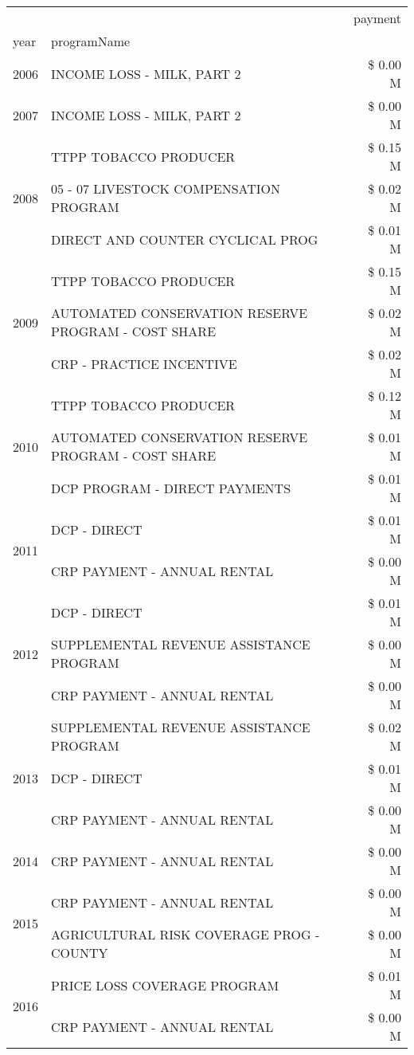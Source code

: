 \begin{tabular}{llr}
\toprule
 &  & payment \\
year & programName &  \\
\midrule
2006 & INCOME LOSS - MILK, PART 2 & \$ 0.00 M \\
\cline{1-3}
2007 & INCOME LOSS - MILK, PART 2 & \$ 0.00 M \\
\cline{1-3}
\multirow[t]{3}{*}{2008} & TTPP TOBACCO PRODUCER & \$ 0.15 M \\
 & 05 - 07 LIVESTOCK COMPENSATION PROGRAM & \$ 0.02 M \\
 & DIRECT AND COUNTER CYCLICAL PROG & \$ 0.01 M \\
\cline{1-3}
\multirow[t]{3}{*}{2009} & TTPP TOBACCO PRODUCER & \$ 0.15 M \\
 & AUTOMATED CONSERVATION RESERVE PROGRAM - COST SHARE & \$ 0.02 M \\
 & CRP - PRACTICE INCENTIVE & \$ 0.02 M \\
\cline{1-3}
\multirow[t]{3}{*}{2010} & TTPP TOBACCO PRODUCER & \$ 0.12 M \\
 & AUTOMATED CONSERVATION RESERVE PROGRAM - COST SHARE & \$ 0.01 M \\
 & DCP PROGRAM - DIRECT PAYMENTS & \$ 0.01 M \\
\cline{1-3}
\multirow[t]{2}{*}{2011} & DCP - DIRECT & \$ 0.01 M \\
 & CRP PAYMENT - ANNUAL RENTAL & \$ 0.00 M \\
\cline{1-3}
\multirow[t]{3}{*}{2012} & DCP - DIRECT & \$ 0.01 M \\
 & SUPPLEMENTAL REVENUE ASSISTANCE PROGRAM & \$ 0.00 M \\
 & CRP PAYMENT - ANNUAL RENTAL & \$ 0.00 M \\
\cline{1-3}
\multirow[t]{3}{*}{2013} & SUPPLEMENTAL REVENUE ASSISTANCE PROGRAM & \$ 0.02 M \\
 & DCP - DIRECT & \$ 0.01 M \\
 & CRP PAYMENT - ANNUAL RENTAL & \$ 0.00 M \\
\cline{1-3}
2014 & CRP PAYMENT - ANNUAL RENTAL & \$ 0.00 M \\
\cline{1-3}
\multirow[t]{2}{*}{2015} & CRP PAYMENT - ANNUAL RENTAL & \$ 0.00 M \\
 & AGRICULTURAL RISK COVERAGE PROG - COUNTY & \$ 0.00 M \\
\cline{1-3}
\multirow[t]{3}{*}{2016} & PRICE LOSS COVERAGE PROGRAM & \$ 0.01 M \\
 & CRP PAYMENT - ANNUAL RENTAL & \$ 0.00 M \\

\end{tabular}
